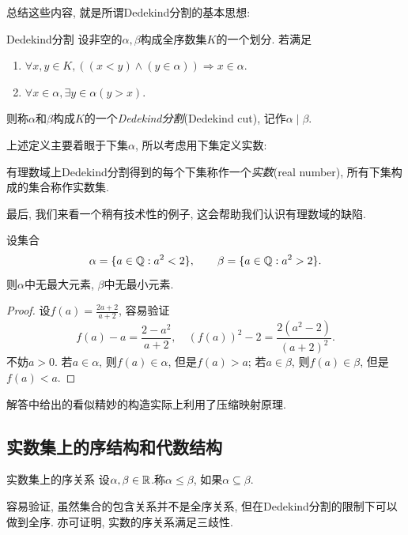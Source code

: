 总结这些内容, 就是所谓Dedekind分割的基本思想: 

\begin{definition}{Dedekind分割}
	设非空的$\alpha , \beta$构成全序数集$K$的一个划分. 若满足
	\begin{enumerate}
		\item $\forall x, y \in K, ((x < y) \wedge (y \in \alpha)) \Rightarrow x \in \alpha$.
		\item $\forall x \in \alpha , \exists y \in \alpha (y>x)$.
	\end{enumerate}
	则称$\alpha$和$\beta$构成$K$的一个\textit{Dedekind分割}(Dedekind cut), 记作$\alpha \mid \beta$. 
\end{definition}

上述定义主要着眼于下集$\alpha$, 所以考虑用下集定义实数: 

\begin{definition}{}
	有理数域上Dedekind分割得到的每个下集称作一个\textit{实数}(real number), 所有下集构成的集合称作实数集.
\end{definition}

最后, 我们来看一个稍有技术性的例子, 这会帮助我们认识有理数域的缺陷. 

\begin{example}
	设集合$$\alpha = \{ a \in \mathbb{Q} :a^2 < 2 \},\qquad \beta = \{ a \in \mathbb{Q} :a^2>2 \}. $$
	则$\alpha$中无最大元素, $\beta$中无最小元素. 
\end{example}
\begin{proof}
	设$f(a)=\frac{2a+2}{a+2}$, 容易验证$$f(a)-a = \frac{2-a^2}{a+2},\quad (f(a))^2-2 = \frac{2(a^2-2)}{(a+2)^2}. $$
	不妨$a>0$. 若$a \in \alpha$, 则$f(a) \in \alpha$, 但是$f(a) > a$; 若$a \in \beta$, 则$f(a) \in \beta$, 但是$f(a) < a$. 
\end{proof}
\begin{remark}
	解答中给出的看似精妙的构造实际上利用了压缩映射原理. 
\end{remark}

\subsection{实数集上的序结构和代数结构}

\begin{definition}{实数集上的序关系}
	设$\alpha , \beta \in \mathbb{R}$.称$\alpha \leq \beta$, 如果$\alpha \subseteq \beta$.
\end{definition}

容易验证, 虽然集合的包含关系并不是全序关系, 但在Dedekind分割的限制下可以做到全序. 亦可证明, 实数的序关系满足三歧性. 

